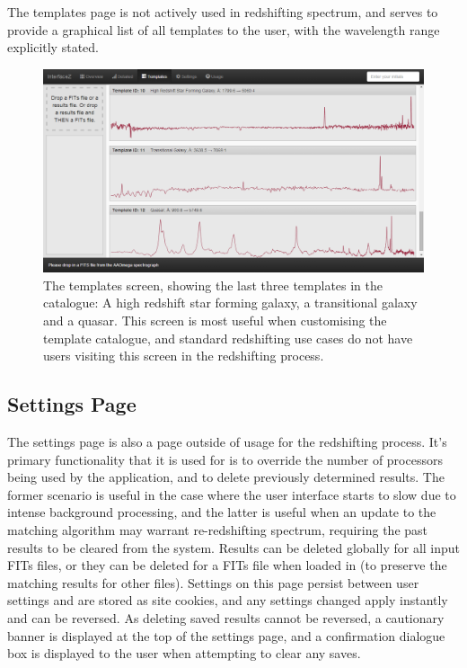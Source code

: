 \documentclass[titlesmallcaps, examinerscopy, copyrightpage]{uqthesis}
\begin{document}
The templates page is not actively used in redshifting spectrum, and serves to provide a graphical list of all templates to the user, with the wavelength range explicitly stated. 


\begin{figure}[ht!]
\includegraphics[width=1\textwidth]{images/templates.png} 
\centering
\caption{The templates screen, showing the last three templates in the catalogue: A high redshift star forming galaxy, a transitional galaxy and a quasar. This screen is most useful when customising the template catalogue, and standard redshifting use cases do not have users visiting this screen in the redshifting process.}
\label{fig:templates}
\end{figure}



\subsection{Settings Page}

The settings page is also a page outside of usage for the redshifting process. It's primary functionality that it is used for is to override the number of processors being used by the application, and to delete previously determined results. The former scenario is useful in the case where the user interface starts to slow due to intense background processing, and the latter is useful when an update to the matching algorithm may warrant re-redshifting spectrum, requiring the past results to be cleared from the system. Results can be deleted globally for all input FITs files, or they can be deleted for a FITs file when loaded in (to preserve the matching results for other files). Settings on this page persist between user settings and are stored as site cookies, and any settings changed apply instantly and can be reversed. As deleting saved results cannot be reversed, a cautionary banner is displayed at the top of the settings page, and a confirmation dialogue box is displayed to the user when attempting to clear any saves.
\end{document}
